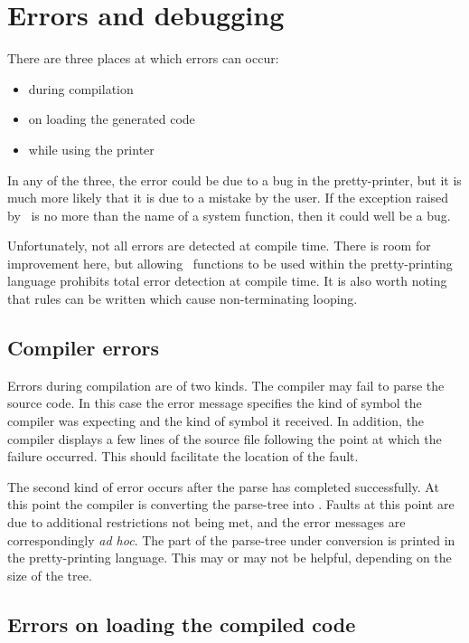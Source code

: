 
\chapter{Errors and debugging\label{debugging}}

There are three places at which errors can occur:

\begin{itemize}
\item{during compilation}
\item{on loading the generated code}
\item{while using the printer}
\end{itemize}

\noindent
In any of the three, the error could be due to a bug in the pretty-printer, but
it is much more likely that it is due to a mistake by the user. If the
exception raised by \ML\ is no more than the name of a system function, then it
could well be a bug.

Unfortunately, not all errors are detected at compile time. There is room for
improvement here, but allowing \ML\ functions to be used within the
pretty-printing language prohibits total error detection at compile time. It is
also worth noting that rules can be written which cause non-terminating
looping.


\section{Compiler errors}

Errors during compilation are of two kinds. The compiler may fail to parse
the source code. In this case the error message specifies the kind of symbol
the compiler was expecting and the kind of symbol it received. In addition,
the compiler displays a few lines of the source file following the point at
which the failure occurred. This should facilitate the location of the fault.

The second kind of error occurs after the parse has completed successfully.
At this point the compiler is converting the parse-tree into \ML. Faults at
this point are due to additional restrictions not being met, and the error
messages are correspondingly {\it ad hoc}. The part of the parse-tree under
conversion is printed in the pretty-printing language. This may or may not be
helpful, depending on the size of the tree.


\section{Errors on loading the compiled code}

